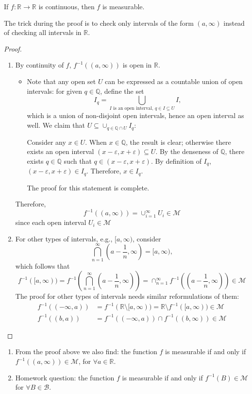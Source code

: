 \begin{proposition}
If $f:\mathbb{R}\to\mathbb{R}$ is continuous, 
then $f$ is measurable.
\end{proposition}
The trick during the proof is to check only intervals of the form $(a,\infty)$ instead of checking all intervals in $\mathbb{R}$.
\begin{proof}
\begin{enumerate}
\item
By continuity of $f$, $f^{-1}((a,\infty))$ is open in $\mathbb{R}$.
\begin{itemize}
\item
Note that any open set $U$ can be expressed as a countable union of open intervals:
for given $q\in\mathbb{Q}$, define the set
\[
I_q=\bigcup_{\text{$I$ is an open interval, $q\in I\subseteq U$}}I,
\]
which is a union of non-disjoint open intervals, hence an open interval as well. We claim that $U\subseteq\cup_{q\in\mathbb{Q}\cap U} I_q$:

Consider any $x\in U$. When $x\in\mathbb{Q}$, the result is clear; otherwise there exists an open interval $(x-\varepsilon,x+\varepsilon)\subseteq U$. By the denseness of $\mathbb{Q}$, there exists $q\in\mathbb{Q}$ such that $q\in(x-\varepsilon,x+\varepsilon)$. By definition of $I_q$, $(x-\varepsilon,x+\varepsilon)\in I_q$. Therefore, $x\in I_q$.

The proof for this statement is complete.
\end{itemize}
Therefore, 
\[
f^{-1}((a,\infty))=\cup_{i=1}^\infty U_i\in\mathcal{M}
\]
since each open interval $U_i\in\mathcal{M}$
\item
For other types of intervals,
e.g., 
$[a,\infty)$, consider
\[
\bigcap_{n=1}^\infty(a-\frac{1}{n},\infty)=[a,\infty),
\]
which follows that 
\[
f^{-1}([a,\infty)) = f^{-1}(\bigcap_{n=1}^\infty(a-\frac{1}{n},\infty))
=
\cap_{n=1}^\infty f^{-1}((a-\frac{1}{n},\infty))\in\mathcal{M}
\]
The proof for other types of intervals needs similar reformulations of them:
\begin{align*}
f^{-1}((-\infty,a))&=f^{-1}(\mathbb{R}\setminus[a,\infty))
=
\mathbb{R}\setminus f^{-1}([a,\infty))\in\mathcal{M}\\
f^{-1}((b,a))&=f^{-1}((-\infty,a))\cap f^{-1}((b,\infty))\in\mathcal{M}
\end{align*}
\end{enumerate}

\end{proof}
\begin{remark}
\begin{enumerate}
\item
From the proof above we also find:
the function $f$ is measurable if and only if $f^{-1}((a,\infty))\in\mathcal{M}$, for $\forall a\in\mathbb{R}$.
\item
Homework question:
the function $f$ is measurable if and only if $f^{-1}(B)\in\mathcal{M}$ for $\forall B\in\mathcal{B}$.
\end{enumerate}
\end{remark}

